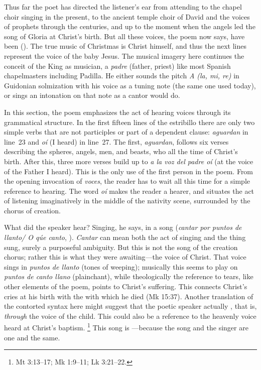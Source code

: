 Thus far the poet has directed the listener's ear from attending to the chapel
choir singing in the present, to the ancient temple choir of David and the
voices of prophets through the centuries, and up to the moment when the angels
led the song of Gloria at Christ's birth.
But all these voices, the poem now says, have been  ().  
The true music of Christmas is Christ himself, and thus the next lines represent
the voice of the baby Jesus.
The musical imagery here continues the conceit of the King as musician, a
\emph{padre} (father, priest) like most Spanish chapelmasters including Padilla.
He either sounds the pitch \emph{A (la, mi, re)} in Guidonian solmization with
his voice as a tuning note (the same one used today), or sings an intonation on
that note as a cantor would do.

In this section, the poem emphasizes the act of hearing voices through its
grammatical structure.
In the first fifteen lines of the estribillo there are only two simple verbs
that are not participles or part of a dependent clause: \emph{aguardan} in
line~23 and \emph{oí} (I heard) in line~27.  
The first, \emph{aguardan}, follows six verses describing the spheres, angels,
men, and beasts, who all  the time of Christ's birth.
After this, three more verses build up to \emph{a la voz del padre oí} (at the
voice of the Father I heard).
This is the only use of the first person in the poem.
From the opening invocation of \emph{voces}, the reader has to wait all this
time for a simple reference to hearing.
The word \emph{oí} makes the reader a hearer, and situates the act of listening
imaginatively in the middle of the nativity scene, surrounded by the chorus of
creation.

What did the speaker hear? 
Singing, he says, in a song (\emph{cantar por puntos de llanto/ O qúe canto},
).
\emph{Cantar} can mean both the act of singing and the thing sung, surely a
purposeful ambiguity.
But this is not the song of the creation chorus; rather this is what they were
awaiting---the voice of Christ.
That voice sings in \emph{puntos de llanto} (tones of weeping); musically this
seems to play on \emph{puntos de canto llano} (plainchant), while theologically
the reference to tears, like other elements of the poem, points to Christ's
suffering.
This connects Christ's cries at his birth with the  with
which he died (Mk 15:37).
Another translation of the contorted syntax here might suggest that the poetic
speaker actually , that is,
\emph{through} the voice of the child.
This could also be a reference to the heavenly voice heard at Christ's baptism.%
    \footnote{Mt 3:13--17; Mk 1:9--11; Lk 3:21--22.}
This song is ---because
the song and the singer are one and the same.

